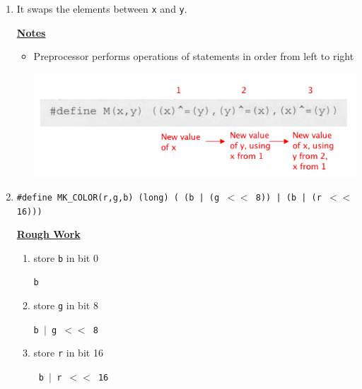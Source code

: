 \documentclass[12pt]{article}
\begin{document}
\begin{enumerate}[1.]
    \item It swaps the elements between \texttt{x} and \texttt{y}.

    \underline{\textbf{Notes}}

    \begin{itemize}
        \item Preprocessor performs operations of statements in order from left to right

        \begin{center}
        \includegraphics[width=\linewidth]{images/review_9_solution_6.png}
        \end{center}
    \end{itemize}

    \item

    \texttt{\#define MK\_COLOR(r,g,b) (long) ( (b | (g $<<$ 8)) | (b | (r $<<$ 16)))}

    \bigskip

    \underline{\textbf{Rough Work}}

    \begin{enumerate}[1.]

        \item store \texttt{b} in bit 0

        \bigskip

        \texttt{b}

        \bigskip

        \item store \texttt{g} in bit 8

        \bigskip

        \texttt{b $\lvert$ g $<<$ 8}

        \bigskip

        \item store \texttt{r} in bit 16

        \texttt{ b $\lvert$  r $<<$ 16}

        \bigskip
    \end{enumerate}

    \bigskip


\end{enumerate}
\end{document}
